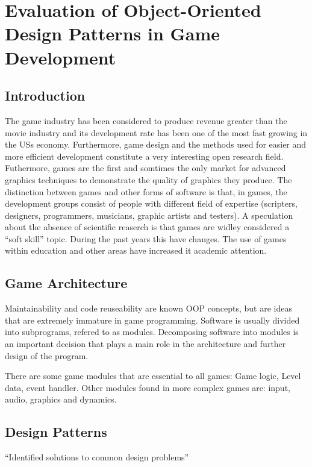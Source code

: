 \chapter{Evaluation of Object-Oriented Design Patterns in Game Development}

  \section*{Introduction}
    The game industry has been considered to produce revenue greater than the movie industry and its development rate has been one of the most fast growing in the USs economy. Furthermore, game design and the methods used for easier and more efficient development constitute a very interesting open research field. Futhermore, games are the first and somtimes the only market for advanced graphics techniques to demonstrate the quality of graphics they produce. The distinction between games and other forms of software is that, in games, the development groups consist of people with different field of expertise (scripters, designers, programmers, musicians, graphic artists and testers). A speculation about the absence of scientific reaserch is that games are widley considered a ``soft skill'' topic. During the past years this have changes. The use of games within education and other areas have increased it academic attention. 

  \section*{Game Architecture}

    Maintainability and code reuseability are known OOP concepts, but are ideas that are extremely immature in game programming. Software is usually divided into subprograms, refered to as modules. Decomposing software into modules is an important decision that plays a main role in the architecture and further design of the program. 

    There are some game modules that are essential to all games: Game logic, Level data, event handler. Other modules found in more complex games are: input, audio, graphics and dynamics. 

  \section*{Design Patterns}

    ``Identified solutions to common design problems''

